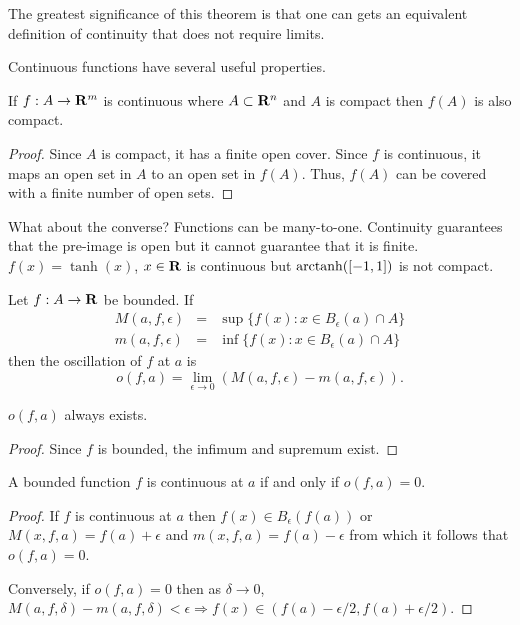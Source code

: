 \begin{rem}
The greatest significance of this theorem is that one can gets an equivalent
definition of continuity that does not require limits.
\end{rem}

Continuous functions have several useful properties.
\begin{thm}\label{c1s3t2}
If $f: A \rightarrow \mathbf{R}^m$ is continuous where $A \subset \mathbf{R}^n$ and $A$
is compact then $f(A)$ is also compact.
\end{thm}
\begin{proof}
Since $A$ is compact, it has a finite open cover. Since $f$ is continuous, it
maps an open set in $A$ to an open set in $f(A)$. Thus, $f(A)$ can be covered
with a finite number of open sets.
\end{proof}

\begin{rem}
What about the converse? Functions can be many-to-one. Continuity guarantees
that the pre-image is open but it cannot guarantee that it is finite. $f(x) =
\tanh(x)$, $x \in \mathbf{R}$ is continuous but $\operatorname{arctanh}([-1, 1])$ is not compact.
\end{rem}

\begin{defn}\label{c1s3d3}
Let $f: A \rightarrow \mathbf{R}$ be bounded. If
\begin{eqnarray*}
M(a, f, \epsilon) &=& \sup\{f(x) : x \in B_\epsilon(a) \cap A\} \\
m(a, f, \epsilon) &=& \inf\{f(x) : x \in B_\epsilon(a) \cap A\} 
\end{eqnarray*}
then the oscillation of $f$ at $a$ is
\[
o(f, a) = \lim_{\epsilon \rightarrow 0} (M(a, f, \epsilon) - m(a, f, \epsilon)).
\]
\end{defn}

\begin{lem}\label{c1s3l1}
$o(f, a)$ always exists.
\end{lem}
\begin{proof}
Since $f$ is bounded, the infimum and supremum exist.
\end{proof}

\begin{thm}\label{c1s3t3}
A bounded function $f$ is continuous at $a$ if and only if $o(f, a) = 0$.
\end{thm}
\begin{proof}
If $f$ is continuous at $a$ then $f(x) \in B_{\epsilon}(f(a))$ or $M(x, f, a)
= f(a) + \epsilon$ and $m(x, f, a) = f(a) - \epsilon$ from which it follows
that $o(f, a) = 0$.

Conversely, if $o(f, a) = 0$ then as $\delta \rightarrow 0$, $M(a,f,\delta)
- m(a, f, \delta) < \epsilon \Rightarrow f(x) \in (f(a) - \epsilon/2, f(a) + 
\epsilon/2)$.
\end{proof}

